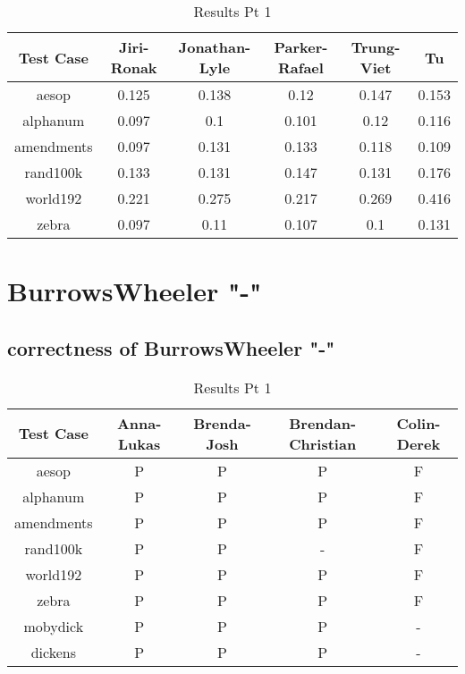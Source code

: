 \documentclass[12pt]{article}
\begin{document}
\begin{table}[ht]
\caption{Results Pt 1}%
\centering %
\begin{tabular}{c c c c c c}%
\hline \hline                        %
Test Case & Jiri-Ronak & Jonathan-Lyle & Parker-Rafael & Trung-Viet & Tu \\ [0.5ex]%
\hline                  %
aesop & 0.125 & 0.138 & 0.12 & 0.147 & 0.153\\
alphanum & 0.097 & 0.1 & 0.101 & 0.12 & 0.116\\
amendments & 0.097 & 0.131 & 0.133 & 0.118 & 0.109 \\
rand100k & 0.133 & 0.131 & 0.147 & 0.131 & 0.176\\
world192 & 0.221 & 0.275 & 0.217 & 0.269 & 0.416\\
zebra & 0.097 & 0.11 & 0.107 & 0.1 & 0.131\\
\hline                  %
\end{tabular}
\label{table:nonlin}
\end{table}




\newpage
\section{BurrowsWheeler "-"}
\subsection{correctness of BurrowsWheeler "-"}
\begin{table}[ht]
\caption{Results Pt 1}%
\centering %
\begin{tabular}{c c c c c}%
\hline \hline
Test Case & Anna-Lukas & Brenda-Josh & Brendan-Christian & Colin-Derek \\ [0.5ex]%
\hline                  %
aesop & P & P & P & F \\
alphanum & P & P & P & F \\
amendments & P & P & P & F \\
rand100k & P & P & - & F \\
world192 & P & P & P & F \\
zebra & P & P & P & F \\
mobydick & P & P & P & - \\
dickens & P & P & P & - \\
\hline                  %
\end{tabular}
\label{table:nonlin}
\end{table}
\end{document}
